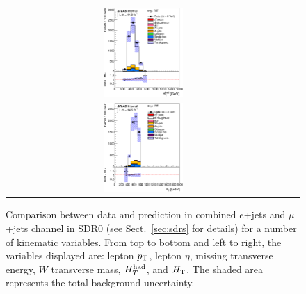 \begin{figure}[h!]
\begin{center}
\begin{tabular}{ccc}
\includegraphics[width=0.30\textwidth]{appendices/figures/sdrs/HTHad_ELEMUONCR0_1W_NOMINAL.eps}  \\
\includegraphics[width=0.30\textwidth]{appendices/figures/sdrs/HTAll_ELEMUONCR0_1W_NOMINAL.eps}  &  &\\
\end{tabular}\caption{\small {Comparison between data and prediction in combined $e$+jets and $\mu$+jets channel in SDR0 (see Sect.~\ref{sec:sdrs} for details) 
for a number of kinematic variables. From top to bottom and left to right, the variables displayed are: lepton $\pt$, lepton $\eta$, missing transverse energy, $W$ transverse mass,
$\hthad$, and $\HT$. The shaded area represents the total background uncertainty.}}
\label{fig:ELEMUONCR0_1}
\end{center}
\end{figure}                                                                             

